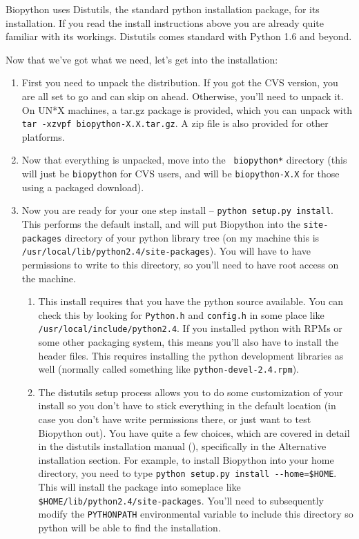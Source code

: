 \documentclass{article}
\begin{document}
Biopython uses Distutils, the standard python installation package, for
its installation. If you read the install instructions above you are
already quite familiar with its workings. Distutils comes standard with 
Python 1.6 and beyond.

Now that we've got what we need, let's get into the installation:

\begin{enumerate}

\item First you need to unpack the distribution. If you got the CVS version, you are all set to go and can skip on ahead. Otherwise, you'll need to unpack it. On UN*X machines, a tar.gz package is provided, which you can unpack with \verb|tar -xzvpf biopython-X.X.tar.gz|. A zip file is also provided for other platforms.

\item Now that everything is unpacked, move into the \verb| biopython*| directory (this will just be \verb|biopython| for CVS users, and will be \verb|biopython-X.X| for those using a packaged download). 

\item Now you are ready for your one step install -- \verb|python setup.py install|. This performs the default install, and will put Biopython into the \verb|site-packages| directory of your python library tree (on my machine this is \verb|/usr/local/lib/python2.4/site-packages|). You will have to have permissions to write to this directory, so you'll need to have root access on the machine.

\begin{enumerate}

\item This install requires that you have the python source available. You can check this by looking for \verb|Python.h| and \verb|config.h| in some place like \verb|/usr/local/include/python2.4|. If you installed python with RPMs or 
some other packaging system, this means you'll also have to install the
header files. This requires installing the python development libraries
as well (normally called something like \verb|python-devel-2.4.rpm|).

\item The distutils setup process allows you to do some customization of your install so you don't have to stick everything in the default location (in case you don't have write permissions there, or just want to test Biopython out). You have quite a few choices, which are covered in detail in the distutils installation manual (), specifically in the Alternative installation section. For example, to install Biopython into your home directory, you need to type \verb|python setup.py install --home=$HOME|. This will install the package into someplace like \verb|$HOME/lib/python2.4/site-packages|. You'll need to subsequently modify the \verb|PYTHONPATH| environmental variable to include this directory so python will be able to find the installation.


\end{enumerate}
\end{enumerate}
\end{document}
